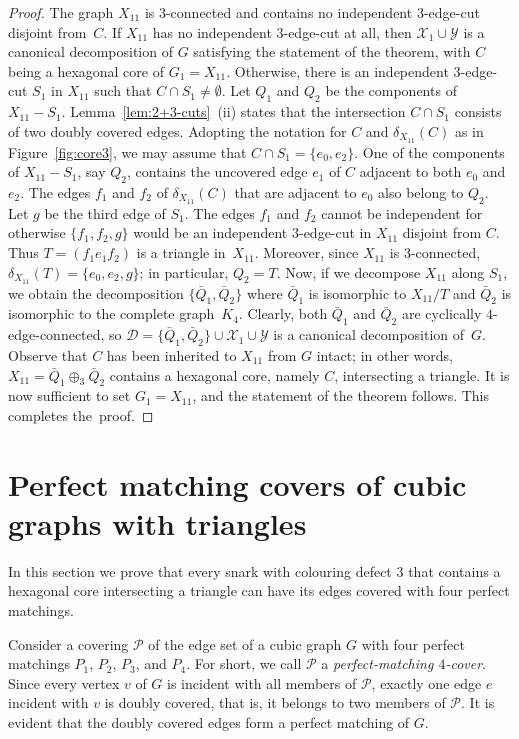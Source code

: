 \documentclass[a4paper]{amsart}
\theoremstyle{plain}
\theoremstyle{definition}
\begin{document}
\begin{proof}
The graph $X_{11}$ is $3$-connected and contains no independent
$3$-edge-cut disjoint from~$C$. If $X_{11}$ has no independent
$3$-edge-cut at all, then $\mathcal{X}_1\cup\mathcal{Y}$ is a
canonical decomposition of $G$ satisfying the statement of the
theorem, with $C$ being a hexagonal core of
\mbox{$G_1=X_{11}$}. Otherwise, there is an independent
$3$-edge-cut $S_1$ in $X_{11}$ such that $C\cap
S_1\ne\emptyset$. Let $Q_1$ and $Q_2$ be the components of
$X_{11}-S_1$. Lemma~\ref{lem:2+3-cuts}~(ii) states that the
intersection $C\cap S_1$ consists of two doubly covered edges.
Adopting the notation for $C$ and $\delta_{X_{11}}(C)$ as in
Figure~\ref{fig:core3}, we may assume that $C\cap
S_1=\{e_0,e_2\}$. One of the components of $X_{11}-S_1$, say
$Q_2$, contains the uncovered edge $e_1$ of $C$ adjacent to
both $e_0$ and $e_2$. The edges $f_1$ and $f_2$ of
$\delta_{X_{11}}(C)$ that are adjacent to $e_0$ also belong to
$Q_2$. Let $g$ be the third edge of $S_1$. The edges $f_1$ and
$f_2$ cannot be independent for otherwise $\{f_1,f_2,g\}$ would
be an independent $3$-edge-cut in $X_{11}$ disjoint from $C$.
Thus $T=(f_1e_1f_2)$ is a triangle in~$X_{11}$. Moreover, since
$X_{11}$ is $3$-connected, $\delta_{X_{11}}(T)=\{e_0,e_2,g\}$;
in particular, $Q_2=T$. Now, if we decompose $X_{11}$ along
$S_1$, we obtain the decomposition $\{\bar Q_1,\bar Q_2\}$
where $\bar Q_1$ is isomorphic to $X_{11}/T$ and $\bar  Q_2$ is
isomorphic to the complete graph~$K_4$. Clearly, both $\bar
Q_1$ and $\bar Q_2$ are cyclically $4$-edge-connected, so
$\mathcal{D}=\{\bar Q_1,\bar
Q_2\}\cup\mathcal{X}_1\cup\mathcal{Y}$ is a canonical
decomposition of~$G$. Observe that $C$ has been
inherited to $X_{11}$ from $G$ intact; in other words,
$X_{11}=\bar Q_1\oplus_3 \bar Q_2$ contains a hexagonal core,
namely $C$, intersecting a triangle. It is now sufficient to
set $G_1=X_{11}$, and the statement of the theorem follows.
This completes the~proof.
\end{proof}


\section{Perfect matching covers of cubic graphs with triangles}\label{sec:cover_triangles}
\noindent{}In this section we prove
that every snark with colouring defect $3$ that contains a hexagonal core
intersecting a triangle can have its edges covered with four
perfect matchings.

Consider a covering $\mathcal{P}$ of the edge set of a cubic
graph $G$ with four perfect matchings $P_1$, $P_2$, $P_3$, and
$P_4$. For short, we call $\mathcal{P}$ a
\emph{perfect-matching $4$-cover}. Since every vertex $v$ of
$G$ is incident with all members of $\mathcal{P}$, exactly one
edge $e$ incident with $v$ is doubly covered, that is, it
belongs to two members of $\mathcal{P}$. It is evident that the
doubly covered edges form a perfect matching of $G$.
\end{document}
